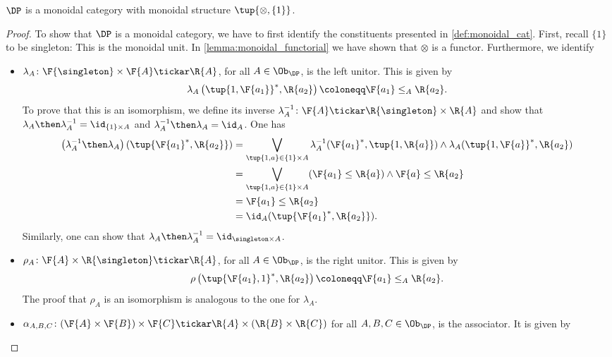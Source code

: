 \begin{lemma}
$\DP$ is a monoidal category with monoidal structure $\tup{\otimes, \{1\}}$.
\end{lemma}
\begin{proof}
To show that $\DP$ is a monoidal category, we have to first identify the constituents presented in \cref{def:monoidal_cat}. First, recall $\{1\}$ to be singleton: This is the monoidal unit. In \cref{lemma:monoidal_functorial} we have shown that $\otimes$ is a functor. Furthermore, we identify
\begin{itemize}
    \item $\lambda_A \colon \F{\singleton} \times \F{A} \tickar \R{A}$, for all $A\in \Ob_\DP$, is the left unitor. This is given by
    \begin{equation}
        \lambda_A\left( \tup{1,\F{a_1}}^*,\R{a_2}\right)\coloneqq \F{a_1}\leq_A \R{a_2}.
    \end{equation}
    To prove that this is an isomorphism, we define its inverse $\lambda_A^{-1}\colon \F{A}\tickar \R{\singleton} \times \R{A}$ and show that $\lambda_A\then \lambda_A^{-1}=\id_{\{1\}\times A}$ and $\lambda_A^{-1}\then \lambda_A=\id_{A}$. One has
    \begin{equation}
        \begin{aligned}
           \left( \lambda_A^{-1}\then \lambda_A\right)(\tup{\F{a_1}^*,\R{a_2}})&= \bigvee_{\tup{1,a}\in  \{1\}\times A} \lambda_A^{-1}(\F{a_1}^*,\tup{1,\R{a}})\wedge \lambda_A(\tup{1,\F{a}}^*,\R{a_2})\\
           &= \bigvee_{\tup{1,a}\in  \{1\}\times A}(\F{a_1}\leq \R{a}) \wedge \F{a}\leq \R{a_2}\\
           &=\F{a_1}\leq \R{a_2}\\
           &=\id_A(\tup{\F{a_1}^*,\R{a_2}}).
        \end{aligned}
    \end{equation}
    Similarly, one can show that $\lambda_A\then \lambda_A^{-1}=\id_{\singleton \times A}$.
    \item $\rho_A\colon \F{A} \times \R{\singleton} \tickar \R{A}$, for all $A\in \Ob_\DP$, is the right unitor. This is given by 
    \begin{equation}
        \rho\left( \tup{\F{a_1},1}^*,\R{a_2}\right)\coloneqq \F{a_1}\leq_A \R{a_2}.
    \end{equation}
    The proof that $\rho_A$ is an isomorphism is analogous to the one for $\lambda_A$.
    \item $\alpha_{A,B,C}\colon (\F{A}\times \F{B})\times \F{C} \tickar \R{A} \times (\R{B}\times \R{C})$ for all $A,B,C \in \Ob_\DP$, is the associator. It is given by

\end{itemize}
\end{proof}
